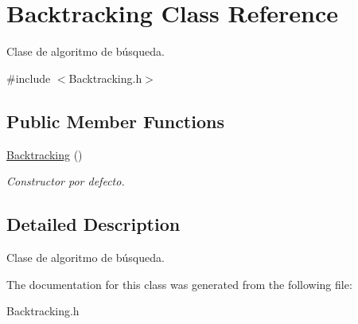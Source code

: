 \hypertarget{classBacktracking}{}\section{Backtracking Class Reference}
\label{classBacktracking}


Clase de algoritmo de búsqueda.  




{\ttfamily \#include $<$Backtracking.\+h$>$}

\subsection*{Public Member Functions}
\begin{DoxyCompactItemize}
\item 
\mbox{\label{classBacktracking_a9afe4ead7d455ef7bd132f21470a20d3}} 
\hyperlink{classBacktracking_a9afe4ead7d455ef7bd132f21470a20d3}{Backtracking} ()
\begin{DoxyCompactList}\small\item\em Constructor por defecto. \end{DoxyCompactList}\end{DoxyCompactItemize}


\subsection{Detailed Description}
Clase de algoritmo de búsqueda. 

The documentation for this class was generated from the following file\+:\begin{DoxyCompactItemize}
\item 
Backtracking.\+h\end{DoxyCompactItemize}
